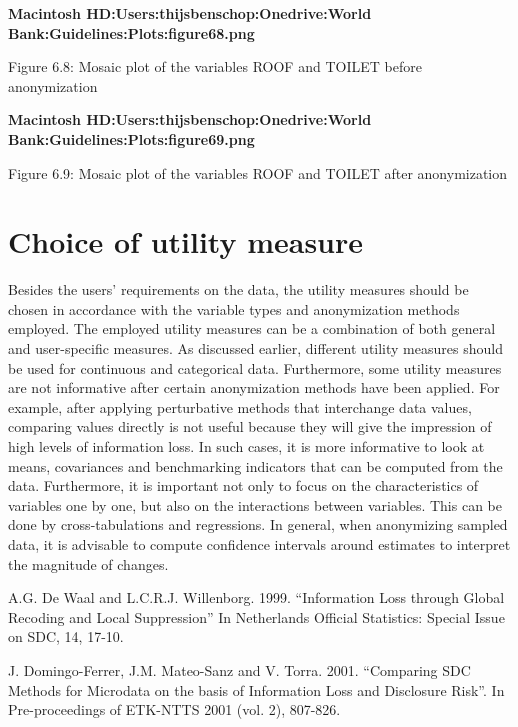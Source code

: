 \documentclass[letterpaper,10pt,english]{sphinxmanual}
\begin{document}
{\color{red}\bfseries{}\textbar{}Macintosh HD:Users:thijsbenschop:Onedrive:World
Bank:Guidelines:Plots:figure68.png\textbar{}}

Figure 6.8: Mosaic plot of the variables ROOF and TOILET before
anonymization

{\color{red}\bfseries{}\textbar{}Macintosh HD:Users:thijsbenschop:Onedrive:World
Bank:Guidelines:Plots:figure69.png\textbar{}}

Figure 6.9: Mosaic plot of the variables ROOF and TOILET after
anonymization


\section{Choice of utility measure}
\label{\detokenize{utility:choice-of-utility-measure}}
Besides the users’ requirements on the data, the utility measures should
be chosen in accordance with the variable types and anonymization
methods employed. The employed utility measures can be a combination of
both general and user-specific measures. As discussed earlier, different
utility measures should be used for continuous and categorical data.
Furthermore, some utility measures are not informative after certain
anonymization methods have been applied. For example, after applying
perturbative methods that interchange data values, comparing values
directly is not useful because they will give the impression of high
levels of information loss. In such cases, it is more informative to
look at means, covariances and benchmarking indicators that can be
computed from the data. Furthermore, it is important not only to focus
on the characteristics of variables one by one, but also on the
interactions between variables. This can be done by cross-tabulations
and regressions. In general, when anonymizing sampled data, it is
advisable to compute confidence intervals around estimates to interpret
the magnitude of changes.


A.G. De Waal and L.C.R.J. Willenborg. 1999. “Information Loss through
Global Recoding and Local Suppression” In Netherlands Official
Statistics: Special Issue on SDC, 14, 17-10.

J. Domingo-Ferrer, J.M. Mateo-Sanz and V. Torra. 2001. “Comparing SDC
Methods for Microdata on the basis of Information Loss and Disclosure
Risk”. In Pre-proceedings of ETK-NTTS 2001 (vol. 2), 807-826.
\end{document}
